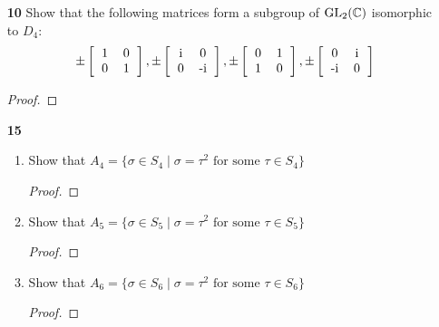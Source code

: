 \documentclass[paper=usletter, fontsize=12pt]{article}
\begin{document}
\begin{itemize}
\begin{itemize}
            \item[\textbf{10}] Show that the following matrices form a subgroup
            of $\text{GL}_2(\mathbb{C})$ isomorphic to $D_4$:
            \begin{equation*}
                \pm\left[\begin{tabular}{cc}
                            1 & 0 \\
                            0 & 1
                \end{tabular}\right],
                \pm\left[\begin{tabular}{cc}
                            i & 0 \\
                            0 & -i
                \end{tabular}\right],
                \pm\left[\begin{tabular}{cc}
                            0 & 1 \\
                            1 & 0
                \end{tabular}\right],
                \pm\left[\begin{tabular}{cc}
                            0 & i \\
                            -i & 0
                \end{tabular}\right]
            \end{equation*}
            \begin{proof}
            \end{proof}

            \item[\textbf{15}]
            \begin{enumerate}[label=\textbf{(\alph*)}]

                \item Show that $A_4=\{\sigma \in S_4 \mid \sigma = \tau^2
                \text{ for some } \tau \in S_4\}$
                \begin{proof}
                \end{proof}

                \item Show that $A_5=\{\sigma \in S_5 \mid \sigma = \tau^2
                \text{ for some } \tau \in S_5\}$
                \begin{proof}
                \end{proof}

                \item Show that $A_6=\{\sigma \in S_6 \mid \sigma = \tau^2
                \text{ for some } \tau \in S_6\}$
                \begin{proof}
                \end{proof}


\end{enumerate}
\end{itemize}
\end{itemize}
\end{document}
